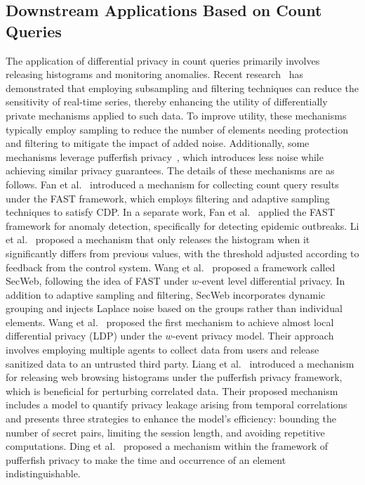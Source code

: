 \subsection{Downstream Applications Based on Count Queries}
The application of differential privacy in count queries primarily involves releasing histograms and monitoring anomalies. Recent research~\cite{koga2022privacy} has demonstrated that employing subsampling and filtering techniques can reduce the sensitivity of real-time series, thereby enhancing the utility of differentially private mechanisms applied to such data. To improve utility, these mechanisms~\cite{fan2013adaptive, fan2013differentially, li2015differentially, wang2017secweb} typically employ sampling to reduce the number of elements needing protection and filtering to mitigate the impact of added noise. Additionally, some mechanisms leverage pufferfish privacy~\cite{liang2020pufferfish, ding2022publishing}, which introduces less noise while achieving similar privacy guarantees. The details of these mechanisms are as follows.
Fan et al.~\cite{fan2013adaptive} introduced a mechanism for collecting count query results under the FAST framework, which employs filtering and adaptive sampling techniques to satisfy CDP.   In a separate work, Fan et al.~\cite{fan2013differentially} applied the FAST framework for anomaly detection, specifically for detecting epidemic outbreaks.
Li et al.~\cite{li2015differentially} proposed a mechanism that only releases the histogram when it significantly differs from previous values, with the threshold adjusted according to feedback from the control system.
Wang et al.~\cite{wang2017secweb} proposed a framework called SecWeb, following the idea of FAST under $w$-event level differential privacy. In addition to adaptive sampling and filtering, SecWeb incorporates dynamic grouping and injects Laplace noise based on the groups rather than individual elements.
Wang et al.~\cite{wang2018privacy} proposed the first mechanism to achieve almost local differential privacy (LDP) under the $w$-event privacy model. Their approach involves employing multiple agents to collect data from users and release sanitized data to an untrusted third party.
Liang et al.~\cite{liang2020pufferfish} introduced a mechanism for releasing web browsing histograms under the pufferfish privacy framework, which is beneficial for perturbing correlated data. Their proposed mechanism includes a model to quantify privacy leakage arising from temporal correlations and presents three strategies to enhance the model's efficiency: bounding the number of secret pairs, limiting the session length, and avoiding repetitive computations. 
Ding et al.~\cite{ding2022publishing} proposed a mechanism within the framework of pufferfish privacy to make the time and occurrence of an element indistinguishable.



